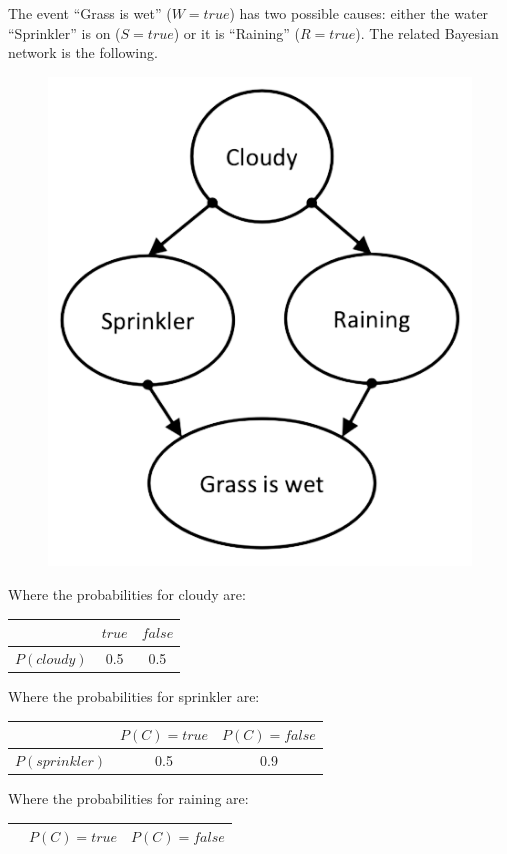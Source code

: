 \documentclass[12pt, a4paper]{report}
\begin{document}
    \begin{example}
        The event “Grass is wet” ($W=true$) has two possible causes: either the water “Sprinkler” is on ($S=true$) or it is “Raining”
        ($R=true$). The related Bayesian network is the following.
        \begin{figure}[H]
            \centering
            \includegraphics[width=0.4\linewidth]{images/sprinkler.png}
        \end{figure}
        Where the probabilities for cloudy are: 
        \begin{table}[H]
            \centering
            \begin{tabular}{c|cc|}
            \cline{2-3}
                                              & $true$ & $false$ \\ \hline
            \multicolumn{1}{|c|}{$P(cloudy)$} & 0.5    & 0.5     \\ \hline
            \end{tabular}
        \end{table}
        Where the probabilities for sprinkler are: 
        \begin{table}[H]
            \centering
            \begin{tabular}{c|cc|}
            \cline{2-3}
                                                 & $P(C)=true$ & $P(C)=false$ \\ \hline
            \multicolumn{1}{|c|}{$P(sprinkler)$} & 0.5         & 0.9          \\ \hline
            \end{tabular}
        \end{table}
        Where the probabilities for raining are: 
        \begin{table}[H]
            \centering
            \begin{tabular}{c|cc|}
            \cline{2-3}
                                               & $P(C)=true$ & $P(C)=false$ \\ \hline

\end{tabular}
\end{table}
\end{example}
\end{document}
